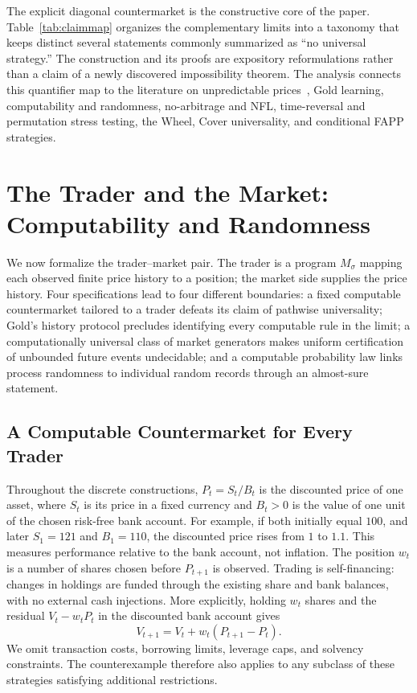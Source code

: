 \documentclass[aps,pra,reprint,superscriptaddress,amsmath,amssymb,floatfix]{revtex4-2}
\theoremstyle{plain}
\theoremstyle{definition}
\theoremstyle{remark}
\begin{document}
The explicit diagonal countermarket is the constructive core of the paper.
Table~\ref{tab:claimmap} organizes the complementary limits into a taxonomy that
keeps distinct several statements commonly summarized as ``no universal
strategy.'' The construction and its proofs are expository reformulations
rather than a claim of a newly discovered impossibility theorem.
The analysis connects this quantifier map to the literature on unpredictable
prices~\cite{Bachelier1900,Samuelson1965,Fama1970}, Gold learning, computability
and randomness, no-arbitrage and NFL, time-reversal and permutation stress
testing, the Wheel, Cover universality, and conditional FAPP strategies.

\section{The Trader and the Market: Computability and Randomness}
\label{sec:computability}

We now formalize the trader--market pair. The trader is a program
\(M_\sigma\) mapping each observed finite price history to a position; the
market side supplies the price history. Four specifications lead to four
different boundaries: a fixed computable countermarket tailored to a trader
defeats its claim of pathwise universality; Gold's history protocol precludes
identifying every computable rule in the limit; a computationally universal
class of market generators makes uniform certification of unbounded future
events undecidable; and a computable probability law links process randomness
to individual random records through an almost-sure statement.

\subsection{A Computable Countermarket for Every Trader}

Throughout the discrete constructions, \(P_t=S_t/B_t\) is the discounted
price of one asset, where \(S_t\) is its price in a fixed currency and
\(B_t>0\) is the value of one unit of the chosen risk-free bank account.
For example, if both initially equal \(100\), and later \(S_1=121\) and
\(B_1=110\), the discounted price rises from \(1\) to \(1.1\).
This measures performance relative to the bank account, not inflation.
The position \(w_t\) is a number of shares chosen before \(P_{t+1}\) is
observed. Trading is self-financing: changes in holdings are funded through
the existing share and bank balances, with no external cash injections.
More explicitly, holding \(w_t\) shares and the residual
\(V_t-w_tP_t\) in the discounted bank account gives
\[
  V_{t+1}=V_t+w_t(P_{t+1}-P_t).
\]
We omit transaction costs, borrowing limits, leverage caps, and solvency
constraints. The counterexample therefore also applies to any subclass of
these strategies satisfying additional restrictions.
\end{document}
